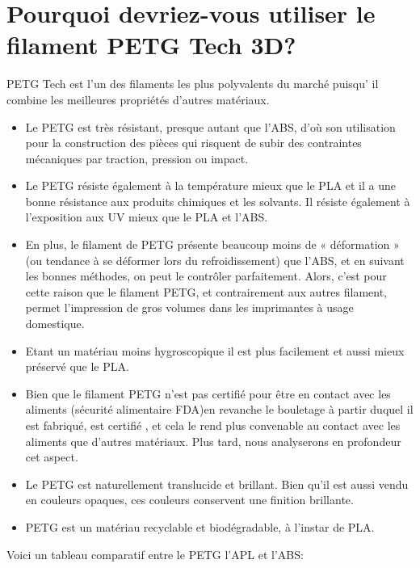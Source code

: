 \documentclass[11pt,a4paper]{article}
\begin{document}
  \section{Pourquoi devriez-vous utiliser le filament PETG Tech 3D?}
PETG Tech est l’un des filaments les plus polyvalents du marché puisqu’ il combine les meilleures propriétés d’autres matériaux.
  \begin{itemize}
  \item Le PETG est très résistant, presque autant que l'ABS, d’où son utilisation pour la construction des pièces qui risquent de  subir des contraintes mécaniques par traction, pression ou impact.
  \item Le PETG résiste également à la température mieux que le PLA et il a une bonne résistance aux produits chimiques et les solvants. Il résiste également à l’exposition aux UV mieux que le PLA et l’ABS.
  \item En plus, le filament de PETG présente beaucoup moins de « déformation » (ou tendance à se déformer lors du refroidissement) que l’ABS, et en suivant les bonnes méthodes, on peut le contrôler parfaitement. Alors, c’est pour cette raison que le filament PETG, et contrairement aux autres filament, permet l’impression de gros volumes dans les imprimantes à usage domestique.
  \item Etant un matériau moins hygroscopique il est plus facilement et aussi mieux préservé que le PLA.
  \item Bien que le filament PETG n’est pas certifié pour être en contact avec les aliments (sécurité alimentaire FDA)en revanche le bouletage à partir duquel il est fabriqué, est certifié , et cela le rend plus convenable au contact avec les aliments que d’autres matériaux. Plus tard, nous analyserons en profondeur cet aspect.
  \item Le PETG est naturellement translucide et brillant. Bien qu’il est aussi vendu en couleurs opaques, ces couleurs conservent une finition brillante.
  \item PETG est un matériau recyclable et biodégradable, à l’instar de PLA.
  \end{itemize}
  Voici un tableau comparatif entre le PETG l’APL et l’ABS:
\end{document}
